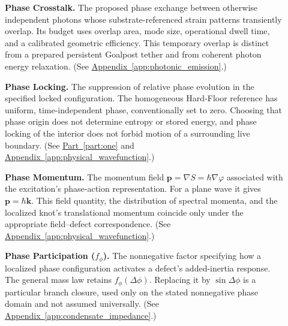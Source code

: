 \begin{description}
\item[] \begin{minipage}[t]{\linewidth}
\textbf{Phase Crosstalk.} The proposed phase exchange between otherwise independent photons whose substrate-referenced strain patterns transiently overlap. Its budget uses overlap area, mode size, operational dwell time, and a calibrated geometric efficiency. This temporary overlap is distinct from a prepared persistent Goalpost tether and from coherent photon energy relaxation.
(See \hyperref[app:photonic_emission]{Appendix~\ref*{app:photonic_emission}}.)
\end{minipage}

\item[] \begin{minipage}[t]{\linewidth}
\textbf{Phase Locking.} The suppression of relative phase evolution in the specified locked configuration. The homogeneous Hard-Floor reference has uniform, time-independent phase, conventionally set to zero. Choosing that phase origin does not determine entropy or stored energy, and phase locking of the interior does not forbid motion of a surrounding live boundary.
(See \hyperref[part:one]{Part~\ref*{part:one}} and \hyperref[app:physical_wavefunction]{Appendix~\ref*{app:physical_wavefunction}}.)
\end{minipage}

\item[] \begin{minipage}[t]{\linewidth}
\textbf{Phase Momentum.} The momentum field $\mathbf p=\nabla S=\hbar\nabla\varphi$ associated with the excitation's phase-action representation. For a plane wave it gives $\mathbf p=\hbar\mathbf k$. This field quantity, the distribution of spectral momenta, and the localized knot's translational momentum coincide only under the appropriate field--defect correspondence.
(See \hyperref[app:physical_wavefunction]{Appendix~\ref*{app:physical_wavefunction}}.)
\end{minipage}

\item[] \begin{minipage}[t]{\linewidth}
\textbf{Phase Participation ($f_\phi$).} The nonnegative factor specifying how a localized phase configuration activates a defect's added-inertia response. The general mass law retains $f_\phi(\Delta\phi)$. Replacing it by $\sin\Delta\phi$ is a particular branch closure, used only on the stated nonnegative phase domain and not assumed universally.
(See \hyperref[app:condensate_impedance]{Appendix~\ref*{app:condensate_impedance}}.)
\end{minipage}


\end{description}
